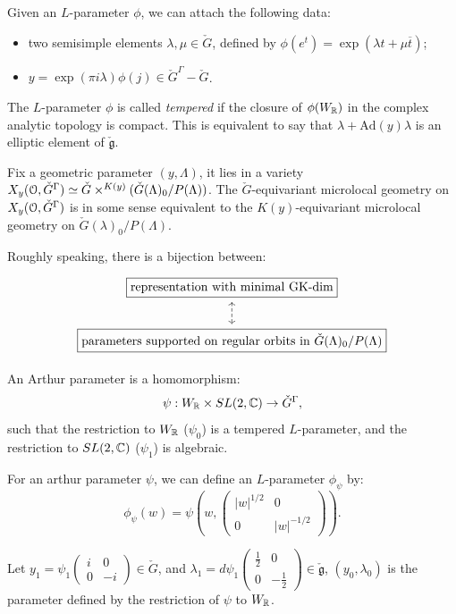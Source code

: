 \documentclass[12pt]{amsart}
\numberwithin{equation}{section}
\newcommand{\fg}{\mathfrak{g}} \newcommand{\fh}{\mathfrak{h}} \newcommand{\fk}{\mathfrak{k}}
\newcommand{\Ad}{{\mathrm{Ad}}}   \newcommand{\ad}{{\mathrm{ad}}}
\renewcommand{\bar}{\overline}
\begin{document}
Given an $L$-parameter $\phi$, we can attach the following data:
\begin{itemize}
  \item two semisimple elements $\lambda,  \mu \in \check{G}$, defined by $\phi(e^t) = \exp(\lambda t + \mu \bar{t})$;
  \item $y = \exp(\pi i \lambda)\phi(j) \in \check{G}^{\Gamma} - \check{G}$.
\end{itemize}

The $L$-parameter $\phi$ is called \emph{tempered} if the closure of $\phi(W_{{\mathbb {R}}})$ in the complex analytic topology is compact. This is equivalent to say that $\lambda + \Ad(y)\lambda$ is an elliptic element of $\check{\fg}$.

Fix a geometric parameter $(y, \Lambda)$, it lies in a variety $X_y({\mathcal {O}},\check{G}^{\Gamma}) \simeq \check{G} \times^{K(y)}(\check{G}(\Lambda)_0/P(\Lambda))$. The $\check{G}$-equivariant microlocal geometry on $X_y({\mathcal {O}},\check{G}^{\Gamma})$ is in some sense equivalent to the $K(y)$-equivariant microlocal geometry on $\check{G}(\lambda)_0/P(\Lambda)$. 


Roughly speaking, there is a bijection between:
\[
\begin{tikzcd}
  \boxed{\text{representation with minimal GK-dim}} \arrow[d,dashed,leftrightarrow]\\
  \boxed{\text{parameters supported on regular orbits in $\check{G}(\Lambda)_0/P(\Lambda)$}}
\end{tikzcd}
\]


\begin{defn}
  An Arthur parameter is a homomorphism:
\[\psi : W_{{\mathbb {R}}} \times SL(2,{\mathbb {C}}) \to \check{G}^{\Gamma},\]
such that the restriction to $W_{{\mathbb {R}}}$ ($\psi_0$) is a tempered $L$-parameter, and the restriction to $SL(2,{\mathbb {C}})$ ($\psi_1$) is algebraic.
\end{defn}


For an arthur parameter $\psi$, we can define an $L$-parameter $\phi_{\psi}$ by:
\[\phi_{\psi}(w) = \psi(w, \begin{pmatrix}|w|^{1/2} & 0 \\ 0 & |w|^{-1/2}\end{pmatrix}).\]

Let $y_1 = \psi_1\begin{pmatrix} i & 0 \\ 0 & -i  \end{pmatrix} \in \check{G}$, and $\lambda_1  = d\psi_1 \begin{pmatrix}\frac{1}{2} & 0 \\ 0 & -\frac{1}{2} \end{pmatrix} \in \check{\fg}$, $(y_0,\lambda_0)$ is the parameter defined by the restriction of $\psi$ to $W_{{\mathbb {R}}}$.
\end{document}
